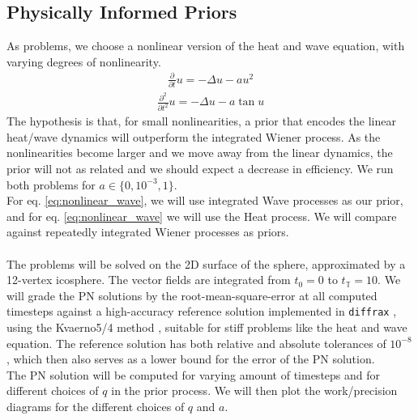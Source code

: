 \subsection*{Physically Informed Priors}
As problems, we choose a nonlinear version of the heat and wave equation, with varying degrees of nonlinearity. 
\begin{align}
    \frac{\partial}{\partial t}u = -\Delta u - au^2\label{eq:nonlinear_heat}
\end{align}
\begin{align}
    \frac{\partial^2}{\partial t^2}u = -\Delta u - a\tan u\label{eq:nonlinear_wave}
\end{align}
The hypothesis is that, for small nonlinearities, a prior that encodes the linear heat/wave dynamics will outperform the integrated Wiener process. As the nonlinearities become larger and we move away from the linear dynamics, the prior will not as related and we should expect a decrease in efficiency.  We run both problems for $a\in\{0, 10^{-3}, 1\}$.
\\ For eq. \ref{eq:nonlinear_wave}, we will use integrated Wave processes as our prior, and for eq. \ref{eq:nonlinear_wave} we will use the Heat process. We will compare against repeatedly integrated Wiener processes as priors.
\\\\
The problems will be solved on the 2D surface of the sphere, approximated by a 12-vertex icosphere. The vector fields are integrated from $t_0=0$ to $t_{\mathbb{T}}=10$.  We will grade the PN solutions by the root-mean-square-error at all computed timesteps against a high-accuracy reference solution implemented in \texttt{diffrax} \cite{diffrax}, using the Kvaerno5/4 method \cite{kvaerno}, suitable for stiff problems like the heat and wave equation. The reference solution has both relative and absolute tolerances of $10^{-8}$, which then also serves as a lower bound for the error of the PN solution.
\\ The PN solution will be computed for varying amount of timesteps and for different choices of $q$ in the prior process. We will then plot the work/precision diagrams for the different choices of $q$ and $a$.
